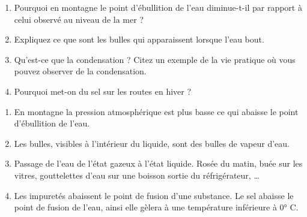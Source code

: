 \documentclass[
  11pt,
  a4paper,
  openany]{book}
\providecommand{\tightlist}{%
  \setlength{\itemsep}{0pt}\setlength{\parskip}{0pt}}
\begin{document}
\begin{Exercise}

\begin{enumerate}
\def\labelenumi{\arabic{enumi}.}
\tightlist
\item
  Pourquoi en montagne le point d'ébullition de l'eau diminue-t-il par rapport à celui observé au niveau de la mer ?\\
\item
  Expliquez ce que sont les bulles qui apparaissent lorsque l'eau bout.\\
\item
  Qu'est-ce que la condensation ? Citez un exemple de la vie pratique où vous pouvez observer de la condensation.\\
\item
  Pourquoi met-on du sel sur les routes en hiver ?\\
\end{enumerate}

\end{Exercise}

\begin{Answer}

\begin{enumerate}
\def\labelenumi{\arabic{enumi}.}
\tightlist
\item
  En montagne la pression atmosphérique est plus basse ce qui abaisse le point d'ébullition de l'eau.\\
\item
  Les bulles, visibles à l'intérieur du liquide, sont des bulles de vapeur d'eau.\\
\item
  Passage de l'eau de l'état gazeux à l'état liquide. Rosée du matin, buée sur les vitres, gouttelettes d'eau sur une boisson sortie du réfrigérateur, \ldots{}\\
\item
  Les impuretés abaissent le point de fusion d'une substance. Le sel abaisse le point de fusion de l'eau, ainsi elle gèlera à une température inférieure à 0° C.
\end{enumerate}

\newpage

\end{Answer}
\end{document}

